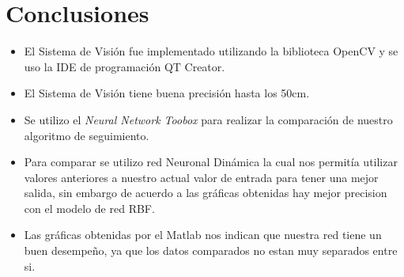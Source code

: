 
\chapter{Conclusiones}

\begin{itemize}
\item El Sistema de Visi\'on fue implementado utilizando la biblioteca OpenCV y se uso la IDE de programaci\'on  QT Creator.
\item El Sistema de Visi\'on tiene buena precisi\'on hasta los 50cm.
\item Se utilizo el \textit{Neural Network Toobox} para realizar la comparaci\'on de nuestro algoritmo de seguimiento.
\item Para comparar se utilizo red Neuronal Din\'amica la cual nos permit\'ia utilizar valores anteriores a nuestro actual valor de entrada para tener una mejor salida, sin embargo de acuerdo a las gr\'aficas obtenidas hay mejor precision con el modelo de red RBF.
\item Las gr\'aficas obtenidas por el Matlab nos indican que nuestra red tiene un buen desempe\~no, ya que los datos comparados no estan muy separados entre si.

\end{itemize}